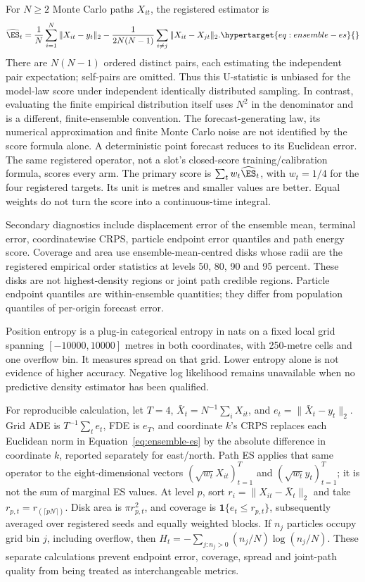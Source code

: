 For \(N\geq2\) Monte Carlo paths \(X_{it}\), the registered estimator is
\begin{equation}
 \widehat{\ES}_t=\frac1N\sum_{i=1}^N\|X_{it}-y_t\|_2
  -\frac{1}{2N(N-1)}\sum_{i\ne j}\|X_{it}-X_{jt}\|_2.
 \label{eq:ensemble-es}\hypertarget{eq:ensemble-es}{}
\end{equation}
There are \(N(N-1)\) ordered distinct pairs, each estimating the independent
pair expectation; self-pairs are omitted. Thus this U-statistic is unbiased
for the model-law score under independent identically distributed sampling.
In contrast, evaluating the finite empirical distribution itself uses
\(N^2\) in the denominator and is a different, finite-ensemble convention.
The forecast-generating law, its numerical approximation and finite Monte
Carlo noise are not identified by the score formula alone. A deterministic
point forecast reduces to its Euclidean error. The same registered operator,
not a slot's closed-score training/calibration formula, scores every arm.
The primary score is \(\sum_t w_t\widehat{\ES}_t\), with \(w_t=1/4\) for
the four registered targets. Its unit is metres and smaller values are better.
Equal weights do not turn the score into a continuous-time integral.

Secondary diagnostics include displacement error of the ensemble mean,
terminal error, coordinatewise CRPS, particle endpoint error quantiles and
path energy score. Coverage and area use ensemble-mean-centred disks whose
radii are the registered empirical order statistics at levels 50, 80, 90
and 95 percent. These disks are not highest-density regions or joint path
credible regions. Particle endpoint quantiles are within-ensemble quantities;
they differ from population quantiles of per-origin forecast error.

Position entropy is a plug-in categorical entropy in nats on a fixed local
grid spanning \([-10000,10000]\) metres in both coordinates, with 250-metre
cells and one overflow bin. It measures spread on that grid. Lower entropy
alone is not evidence of higher accuracy. Negative log likelihood remains
unavailable when no predictive density estimator has been qualified.

For reproducible calculation, let \(T=4\),
\(\bar X_t=N^{-1}\sum_iX_{it}\), and \(e_t=\|\bar X_t-y_t\|_2\).
Grid ADE is \(T^{-1}\sum_t e_t\), FDE is \(e_T\), and coordinate \(k\)'s
CRPS replaces each Euclidean norm in Equation~\eqref{eq:ensemble-es} by the
absolute difference in coordinate \(k\), reported separately for east/north.
Path ES applies that same operator to the eight-dimensional vectors
\((\sqrt{w_t}X_{it})_{t=1}^T\) and \((\sqrt{w_t}y_t)_{t=1}^T\);
it is not the sum of marginal ES values.
At level \(p\), sort \(r_i=\|X_{it}-\bar X_t\|_2\) and take
\(r_{p,t}=r_{(\lceil pN\rceil)}\). Disk area is \(\pi r_{p,t}^2\), and
coverage is \(\mathbf1\{e_t\leq r_{p,t}\}\), subsequently averaged over
registered seeds and equally weighted blocks. If \(n_j\) particles occupy
grid bin \(j\), including overflow, then
\(H_t=-\sum_{j:n_j>0}(n_j/N)\log(n_j/N)\).
These separate calculations prevent endpoint error, coverage, spread and
joint-path quality from being treated as interchangeable metrics.


